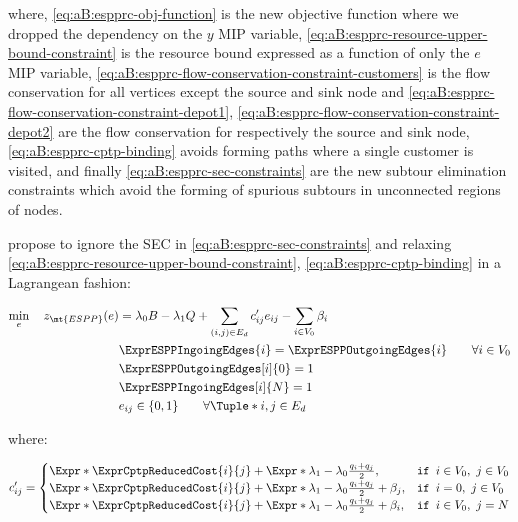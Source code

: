 where, \eqref{eq:aB:espprc-obj-function} is the new objective function where we dropped the dependency on the $y$ MIP variable,
\eqref{eq:aB:espprc-resource-upper-bound-constraint} is the resource bound expressed as a function of only the $e$ MIP variable,
\eqref{eq:aB:espprc-flow-conservation-constraint-customers} is the flow conservation for all vertices except the source and sink node
and \eqref{eq:aB:espprc-flow-conservation-constraint-depot1}, \eqref{eq:aB:espprc-flow-conservation-constraint-depot2} are the flow conservation for respectively the source and sink node,
\eqref{eq:aB:espprc-cptp-binding} avoids forming paths where a single customer is visited,
and finally \eqref{eq:aB:espprc-sec-constraints} are the new subtour elimination constraints which avoid the forming of spurious subtours in unconnected regions of nodes.

\cite{beasley1989} propose to ignore the SEC in \eqref{eq:aB:espprc-sec-constraints} and relaxing \eqref{eq:aB:espprc-resource-upper-bound-constraint}, \eqref{eq:aB:espprc-cptp-binding} in a Lagrangean fashion:

\begin{align}
	\min_{e} \quad z_\mt{ESPP}(e) & = \lambda_0 B - \lambda_1 Q + \sum_{(i, j) \in E_d}  c^\prime_{ij} e_{ij} - \sum_{i \in V_0} \beta_i  \label{eq:aB:esp-relaxed-obj-function} \\
	                              & \ExprESPPIngoingEdges{i} = \ExprESPPOutgoingEdges{i}        \qquad \forall i \in V_0                                                         \\
	                              & \ExprESPPOutgoingEdges[i]{0} = 1                                                                                                             \\
	                              & \ExprESPPIngoingEdges[i]{N} = 1                                                                                                              \\
	                              & e_{ij}                   \in \lbrace 0, 1 \rbrace           \qquad \forall \Tuple*{i, j} \in E_d
\end{align}

where:

\begin{equation}
	c^\prime_{ij} =
	\begin{cases}
		\Expr*{\ExprCptpReducedCost{i}{j}} + \Expr*{\lambda_1 - \lambda_0} \frac{q_i + q_j}{2},           & \texttt{if } i \in V_0,\ j \in V_0 \\
		\Expr*{\ExprCptpReducedCost{i}{j}} + \Expr*{\lambda_1 - \lambda_0} \frac{q_i + q_j}{2} + \beta_j, & \texttt{if } i = 0,\ j \in V_0     \\
		\Expr*{\ExprCptpReducedCost{i}{j}} + \Expr*{\lambda_1 - \lambda_0} \frac{q_i + q_j}{2} + \beta_i, & \texttt{if } i \in V_0,\ j = N
	\end{cases}
\end{equation}

